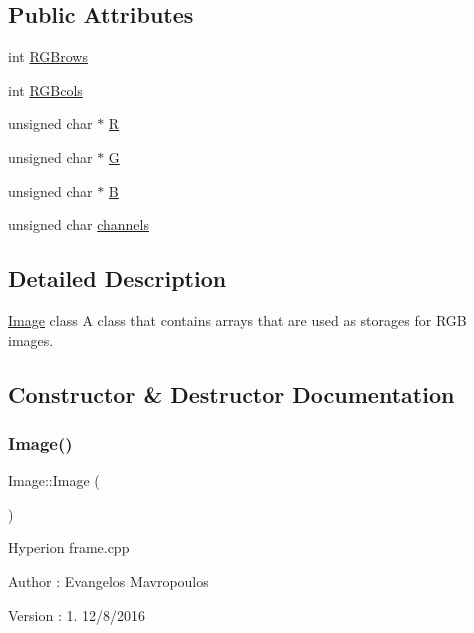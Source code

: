 \subsection*{Public Attributes}
\begin{DoxyCompactItemize}
\item 
int \mbox{\hyperlink{classImage_a889c1999ea31650f1337ba4c349a9d69}{R\+G\+Brows}}
\item 
int \mbox{\hyperlink{classImage_a83e180c07c91e9bc194e52f962a3edd3}{R\+G\+Bcols}}
\item 
unsigned char $\ast$ \mbox{\hyperlink{classImage_a7792d25cb1b88da78b52994d25e66c50}{R}}
\item 
unsigned char $\ast$ \mbox{\hyperlink{classImage_a6678f22311b545bb530a9138d3639bdd}{G}}
\item 
unsigned char $\ast$ \mbox{\hyperlink{classImage_a360ce541c19a88fef24a08cbebceeac5}{B}}
\item 
unsigned char \mbox{\hyperlink{classImage_a1cbaf48be2c575a75bd06d624ba91b41}{channels}}
\end{DoxyCompactItemize}


\subsection{Detailed Description}
\mbox{\hyperlink{classImage}{Image}} class A class that contains arrays that are used as storages for R\+GB images. 

\subsection{Constructor \& Destructor Documentation}
\mbox{\label{classImage_a58edd1c45b4faeb5f789b0d036d02313}} 
\subsubsection{\texorpdfstring{Image()}{Image()}\hspace{0.1cm}{\footnotesize\ttfamily [1/5]}}
{\footnotesize\ttfamily Image\+::\+Image (\begin{DoxyParamCaption}{ }\end{DoxyParamCaption})}

Hyperion frame.\+cpp

\begin{DoxyAuthor}{Author}
\+: Evangelos Mavropoulos 
\end{DoxyAuthor}
\begin{DoxyVersion}{Version}
\+: 1. 12/8/2016 
\end{DoxyVersion}
\mbox{\label{classImage_adc39a6501723c1f780b60ad9893f9c4b}} 
